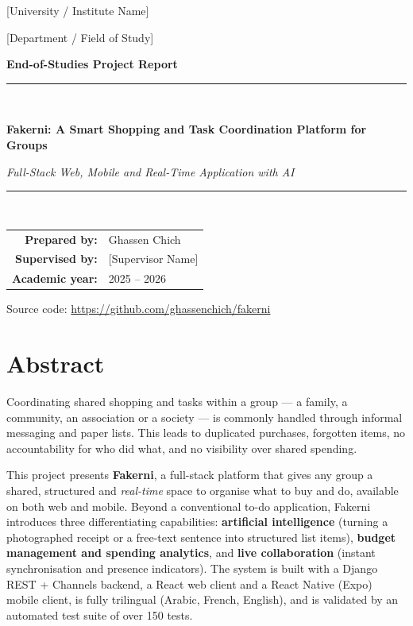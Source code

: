 \documentclass[12pt,a4paper,oneside]{report}
\newcommand{\myTitle}{Fakerni: A Smart Shopping and Task Coordination Platform for Groups}
\newcommand{\mySubtitle}{Full-Stack Web, Mobile and Real-Time Application with AI}
\newcommand{\myAuthor}{Ghassen Chich}          %
\newcommand{\mySupervisor}{[Supervisor Name]}   %
\newcommand{\myUniversity}{[University / Institute Name]}
\newcommand{\myDept}{[Department / Field of Study]}
\newcommand{\myYear}{2025 -- 2026}
\begin{document}
\begin{titlepage}
\centering
\vspace*{0.5cm}
{\large \myUniversity\par}
{\large \myDept\par}
\vspace{2cm}
{\Large\bfseries End-of-Studies Project Report\par}
\vspace{1.5cm}
\rule{\linewidth}{0.5mm}\\[0.5cm]
{\huge\bfseries\color{brand} \myTitle \par}
\vspace{0.4cm}
{\large\itshape \mySubtitle \par}
\rule{\linewidth}{0.5mm}\\[2cm]

\begin{tabular}{rl}
\textbf{Prepared by:} & \myAuthor\\[6pt]
\textbf{Supervised by:} & \mySupervisor\\[6pt]
\textbf{Academic year:} & \myYear\\
\end{tabular}

\vfill
{\small Source code: \url{https://github.com/ghassenchich/fakerni}\par}
\end{titlepage}

\chapter*{Abstract}
\thispagestyle{fancy}

Coordinating shared shopping and tasks within a group --- a family, a
community, an association or a society --- is commonly handled through informal
messaging and paper lists. This leads to duplicated purchases, forgotten items,
no accountability for who did what, and no visibility over shared spending.

This project presents \textbf{Fakerni}, a full-stack platform that gives any
group a shared, structured and \emph{real-time} space to organise what to buy
and do, available on both web and mobile. Beyond a conventional to-do
application, Fakerni introduces three differentiating capabilities:
\textbf{artificial intelligence} (turning a photographed receipt or a free-text
sentence into structured list items), \textbf{budget management and spending
analytics}, and \textbf{live collaboration} (instant synchronisation and
presence indicators). The system is built with a Django REST + Channels
backend, a React web client and a React Native (Expo) mobile client, is fully
trilingual (Arabic, French, English), and is validated by an automated test
suite of over 150 tests.
\end{document}

